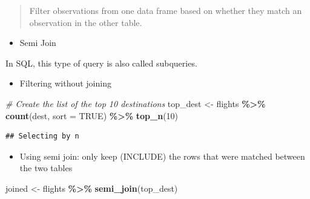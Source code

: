 \documentclass[
]{book}
\newenvironment{Shaded}{\begin{snugshade}}{\end{snugshade}}
\newcommand{\AttributeTok}[1]{\textcolor[rgb]{0.13,0.29,0.53}{#1}}
\newcommand{\CommentTok}[1]{\textcolor[rgb]{0.56,0.35,0.01}{\textit{#1}}}
\newcommand{\ConstantTok}[1]{\textcolor[rgb]{0.56,0.35,0.01}{#1}}
\newcommand{\DecValTok}[1]{\textcolor[rgb]{0.00,0.00,0.81}{#1}}
\newcommand{\FunctionTok}[1]{\textcolor[rgb]{0.13,0.29,0.53}{\textbf{#1}}}
\newcommand{\NormalTok}[1]{#1}
\newcommand{\OtherTok}[1]{\textcolor[rgb]{0.56,0.35,0.01}{#1}}
\newcommand{\SpecialCharTok}[1]{\textcolor[rgb]{0.81,0.36,0.00}{\textbf{#1}}}
\providecommand{\tightlist}{%
  \setlength{\itemsep}{0pt}\setlength{\parskip}{0pt}}
\begin{document}
\begin{quote}
Filter observations from one data frame based on whether they match an observation in the other table.
\end{quote}

\begin{itemize}
\tightlist
\item
  Semi Join
\end{itemize}

In SQL, this type of query is also called subqueries.

\begin{itemize}
\tightlist
\item
  Filtering without joining
\end{itemize}

\begin{Shaded}
\begin{Highlighting}[]
\CommentTok{\# Create the list of the top 10 destinations}
\NormalTok{top\_dest }\OtherTok{\textless{}{-}}\NormalTok{ flights }\SpecialCharTok{\%\textgreater{}\%}
  \FunctionTok{count}\NormalTok{(dest, }\AttributeTok{sort =} \ConstantTok{TRUE}\NormalTok{) }\SpecialCharTok{\%\textgreater{}\%}
  \FunctionTok{top\_n}\NormalTok{(}\DecValTok{10}\NormalTok{)}
\end{Highlighting}
\end{Shaded}

\begin{verbatim}
## Selecting by n
\end{verbatim}

\begin{Shaded}
\end{Shaded}

\begin{itemize}
\tightlist
\item
  Using semi join: only keep (INCLUDE) the rows that were matched between the two tables
\end{itemize}

\begin{Shaded}
\begin{Highlighting}[]
\NormalTok{joined }\OtherTok{\textless{}{-}}\NormalTok{ flights }\SpecialCharTok{\%\textgreater{}\%}
  \FunctionTok{semi\_join}\NormalTok{(top\_dest)}
\end{Highlighting}
\end{Shaded}
\end{document}
